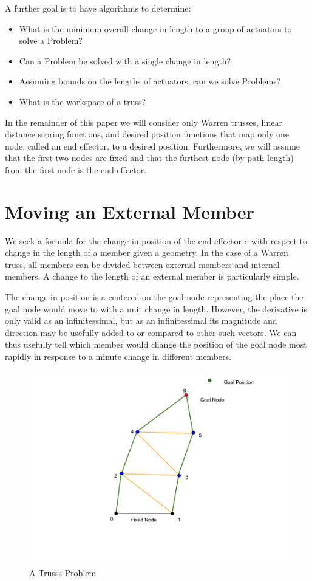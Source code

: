 \documentclass[11pt]{article}
\begin{document}
A further goal is to have algorithms to determine:
\begin{itemize}
\item What is the minimum overall change in length to a group of actuators to solve a Problem?
\item Can a Problem be solved with a single change in length?
\item Assuming bounds on the lengths of actuators, can we solve Problems?
  \item What is the workspace of a truss?
  \end{itemize}

In the remainder of this paper we will consider only Warren trusses, linear distance scoring functions, and desired position functions
that map only one node, called an end effector, to a desired position. Furthermore, we will assume that the first two nodes are fixed
and that the furthest node (by path length) from the first node is the end effector.

\section{Moving an External Member}

We seek a formula for the change in position of the end effector $e$ with respect to change in the length of a member given a geometry.
In the case of a Warren truss, all members can be divided between external members and internal members. A change to the length of an
external member is particularly simple.

The change in position is a centered on the goal node representing the place the goal node would move to with a unit change in length.
However, the derivative is only valid as an infinitessimal, but as an infinitessimal its magnitude and direction may be usefully
added to or compared to other such vectors. We can thus usefully tell which member would change the position of the goal node most
rapidly in response to a minute change in different members.

\begin{figure}
  \centering
  \includegraphics[width=\textwidth]{Diagram for Derivatives of Ladder.png}
  \caption{A Trusss Problem}  
\end{figure}
\end{document}
